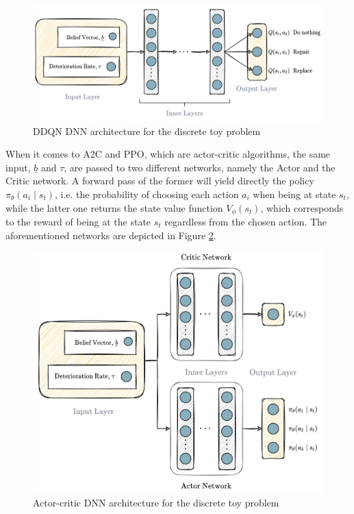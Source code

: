 \begin{figure}[H]
    \centering
	\includegraphics[width=\linewidth]{Figures/dnnToyDiscDDQN.png}
	\caption{\gls{DDQN} \gls{DNN} architecture for the discrete toy problem}
	\label{dnnToyDiscDDQN}
\end{figure}

When it comes to \gls{A2C} and \gls{PPO}, which are actor-critic algorithms, the same input, $\underline{b}$ and $\tau$, are passed to two different networks, namely the Actor and the Critic network. A forward pass of the former will yield directly the policy $\pi _{\theta}(a_i \mid s_t)$, i.e. the probability of choosing each action $a_i$ when being at state $s_t$, while the latter one returns the state value function $V_{\phi}(s_t)$, which corresponds to the reward of being at the state $s_t$ regardless from the chosen action. The aforementioned networks are depicted in Figure \ref{dnnToyDiscPPO}.

\begin{figure}[H]
    \centering
	\includegraphics[width=0.9\linewidth]{Figures/dnnToyDiscPPO.png}
	\caption{Actor-critic \gls{DNN} architecture for the discrete toy problem}
	\label{dnnToyDiscPPO}
\end{figure}

